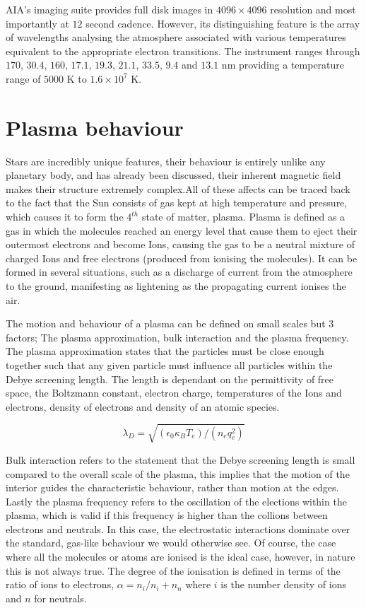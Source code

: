 AIA's imaging suite provides full disk images in $4096 \times 4096$ resolution and most importantly at $12$ second cadence.
However, its distinguishing feature is the array of wavelengths analysing the atmosphere \cite{AIAspec} associated with various temperatures equivalent to the appropriate electron transitions.
The instrument ranges through $170$, $30.4$, $160$, $17.1$, $19.3$, $21.1$, $33.5$, $9.4$ and $13.1$ nm providing a temperature range of $5000$ K to $1.6 \times 10^7$ K.




\section{Plasma behaviour}

Stars are incredibly unique features, their behaviour is entirely unlike any planetary body, and has already been discussed, their inherent magnetic field makes their structure extremely complex.All of these affects can be traced back to the fact that the Sun consists of gas kept at high temperature and pressure, which causes it to form the $4^{th}$ state of matter, plasma.
Plasma is defined as a gas in which the molecules reached an energy level that cause them to eject their outermost electrons and become Ions, causing the gas to be a neutral mixture of charged Ions and free electrons (produced from ionising the molecules).
It can be formed in several situations, such as a discharge of current from the atmosphere to the ground, manifesting as lightening as the propagating current ionises the air.

The motion and behaviour of a plasma can be defined on small scales but 3 factors; The plasma approximation, bulk interaction and the plasma frequency.
The plasma approximation states that the particles must be close enough together such that any given particle must influence all particles within the Debye screening length.
The length is dependant on the permittivity of free space, the Boltzmann constant, electron charge, temperatures of the Ions and electrons, density of electrons and density of an atomic species.

\begin{equation}
	\lambda_D = \sqrt{(\epsilon_0\kappa_BT_e)/(n_eq_e^2)}
\end{equation}

Bulk interaction refers to the statement that the Debye screening length is small compared to the overall scale of the plasma, this implies that the motion of the interior guides the characteristic behaviour, rather than motion at the edges.
Lastly the plasma frequency refers to the oscillation of the elections within the plasma, which is valid if this frequency is higher than the collions between electrons and neutrals.
In this case, the electrostatic interactions dominate over the standard, gas-like behaviour we would otherwise see.
Of course, the case where all the molecules or atoms are ionised is the ideal case, however, in nature this is not always true.
The degree of the ionisation is defined in terms of the ratio of ions to electrons, $\alpha = n_i/{n_i + n_n}$ where $i$ is the number density of ions and $n$ for neutrals.


